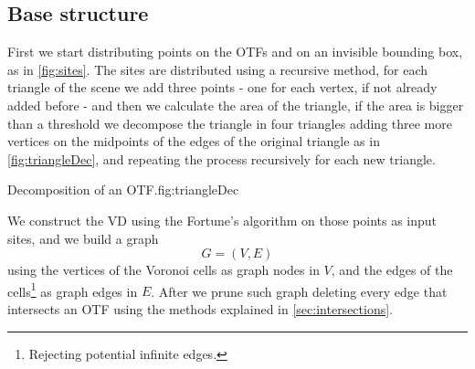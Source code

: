 \documentclass[dissertation.tex]{subfiles}
\begin{document}
\subsection{Base structure}
First we
start distributing points on the \acp{OTF} and on
an invisible bounding box, as in \cref{fig:sites}.
The sites are distributed using a recursive method, for each triangle
of the scene we add three points - one for each
vertex, if not already added before - and then we calculate the area
of the triangle, if the area is bigger than a threshold we decompose
the triangle in four triangles adding three more vertices on the
midpoints of the edges of the original triangle as in
\cref{fig:triangleDec}, and repeating the process recursively for
each new triangle.
\begin{myfig}{Decomposition of an \ac{OTF}.}{fig:triangleDec}
\end{myfig}

We construct the \ac{VD} using the Fortune's algorithm
\cite{fortune} on
those points as input sites, and we build a graph
$$G=(V,E)$$
using the vertices
of the Voronoi cells as graph nodes in $V$, and the edges of the cells\footnote{Rejecting potential
  infinite edges.} as graph edges in $E$. After we prune such graph deleting every edge that
intersects an \ac{OTF} using the methods explained in \cref{sec:intersections}.
\end{document}
